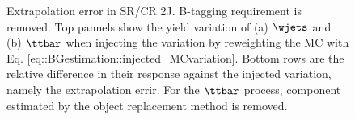 \begin{figure}[h]
 \caption{Extrapolation error in SR/CR 2J. B-tagging requirement is removed. Top pannels show the yield variation of (a) $\wjets$ and (b) $\ttbar$ when injecting the variation by reweighting the MC with Eq. \ref{eq::BGestimation::injected_MCvariation}. Bottom rows are the relative difference in their response against the injected variation, namely the extrapolation errir. For the $\ttbar$ process, component estimated by the object replacement method is removed.  \label{fig::BGestimation::valid_extp_2J} }
\end{figure}



